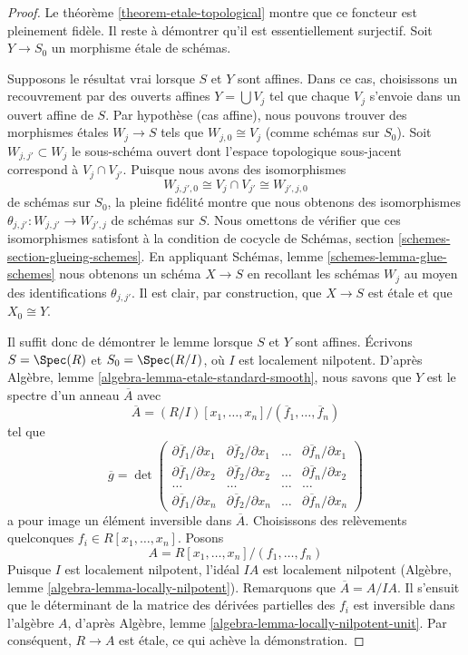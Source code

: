 \begin{proof}
Le théorème \ref{theorem-etale-topological}
montre que ce foncteur est pleinement fidèle.
Il reste à démontrer qu'il est essentiellement surjectif.
Soit $Y \to S_0$ un morphisme \'etale de schémas.

\medskip\noindent
Supposons le résultat vrai lorsque $S$ et $Y$ sont affines.
Dans ce cas, choisissons un recouvrement par des ouverts affines
$Y = \bigcup V_j$ tel que chaque $V_j$ s'envoie
dans un ouvert affine de $S$. Par hypothèse (cas affine), nous pouvons
trouver des morphismes \'etales $W_j \to S$ tels que $W_{j, 0} \cong V_j$
(comme schémas sur $S_0$). Soit $W_{j, j'} \subset W_j$
le sous-schéma ouvert dont l'espace topologique sous-jacent
correspond à $V_j \cap V_{j'}$. Puisque nous avons des isomorphismes
$$
W_{j, j', 0} \cong V_j \cap V_{j'} \cong W_{j', j, 0}
$$
de schémas sur $S_0$, la pleine fidélité montre que nous
obtenons des isomorphismes
$\theta_{j, j'} : W_{j, j'} \to W_{j', j}$ de schémas sur $S$.
Nous omettons de vérifier que ces isomorphismes satisfont à la
condition de cocycle de Schémas, section \ref{schemes-section-glueing-schemes}.
En appliquant Schémas, lemme \ref{schemes-lemma-glue-schemes}
nous obtenons un schéma $X \to S$ en
recollant les schémas $W_j$ au moyen des identifications $\theta_{j, j'}$.
Il est clair, par construction, que $X \to S$ est \'etale et que $X_0 \cong Y$.

\medskip\noindent
Il suffit donc de démontrer le lemme lorsque $S$ et $Y$ sont affines.
Écrivons $S = \Spec(R)$ et $S_0 = \Spec(R/I)$, où $I$ est localement nilpotent.
D'après Algèbre, lemme \ref{algebra-lemma-etale-standard-smooth}, nous savons que
$Y$ est le spectre d'un anneau $\overline{A}$ avec
$$
\overline{A} = (R/I)[x_1, \ldots, x_n]/(\overline{f}_1, \ldots, \overline{f}_n)
$$
tel que
$$
\overline{g} =
\det
\left(
\begin{matrix}
\partial \overline{f}_1/\partial x_1 &
\partial \overline{f}_2/\partial x_1 &
\ldots &
\partial \overline{f}_n/\partial x_1 \\
\partial \overline{f}_1/\partial x_2 &
\partial \overline{f}_2/\partial x_2 &
\ldots &
\partial \overline{f}_n/\partial x_2 \\
\ldots & \ldots & \ldots & \ldots \\
\partial \overline{f}_1/\partial x_n &
\partial \overline{f}_2/\partial x_n &
\ldots &
\partial \overline{f}_n/\partial x_n
\end{matrix}
\right)
$$
a pour image un élément inversible dans $\overline{A}$. Choisissons des relèvements quelconques
$f_i \in R[x_1, \ldots, x_n]$. Posons
$$
A = R[x_1, \ldots, x_n]/(f_1, \ldots, f_n)
$$
Puisque $I$ est localement nilpotent, l'idéal $IA$ est localement nilpotent
(Algèbre, lemme \ref{algebra-lemma-locally-nilpotent}).
Remarquons que $\overline{A} = A/IA$.
Il s'ensuit que le déterminant de la matrice des dérivées partielles des
$f_i$ est inversible dans l'algèbre $A$, d'après
Algèbre, lemme \ref{algebra-lemma-locally-nilpotent-unit}.
Par conséquent, $R \to A$ est \'etale, ce qui achève la démonstration.
\end{proof}



